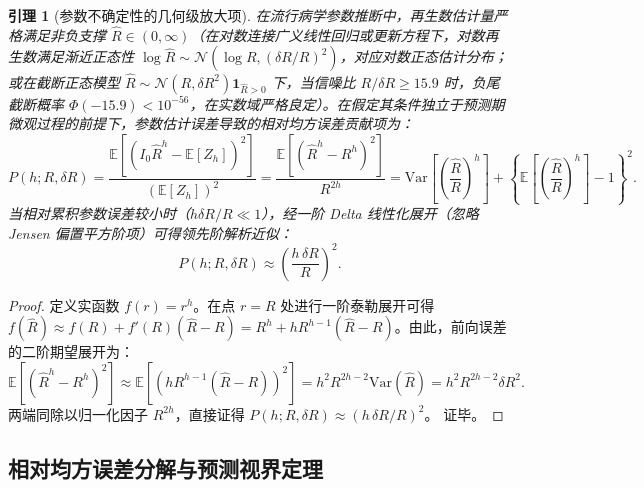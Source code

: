 \documentclass[11pt,a4paper]{article}
\theoremstyle{plain}
\newtheorem{lemma}{引理}
\theoremstyle{definition}
\begin{document}
\begin{lemma}[参数不确定性的几何级放大项]\label{lem:param_amplification}
在流行病学参数推断中，再生数估计量严格满足非负支撑 $\hat{R} \in (0, \infty)$（在对数连接广义线性回归或更新方程下，对数再生数满足渐近正态性 $\log \hat{R} \sim \mathcal{N}(\log R, (\delta R / R)^2)$，对应对数正态估计分布；或在截断正态模型 $\hat{R} \sim \mathcal{N}(R, \delta R^2)\mathbf{1}_{\hat{R}>0}$ 下，当信噪比 $R/\delta R \ge 15.9$ 时，负尾截断概率 $\Phi(-15.9) < 10^{-56}$，在实数域严格良定）。在假定其条件独立于预测期微观过程的前提下，参数估计误差导致的相对均方误差贡献项为：
\begin{equation}
P(h; R, \delta R) = \frac{\mathbb{E}[(I_0 \hat{R}^h - \mathbb{E}[Z_h])^2]}{(\mathbb{E}[Z_h])^2} = \frac{\mathbb{E}[(\hat{R}^h - R^h)^2]}{R^{2h}} = \text{Var}\left[\left(\frac{\hat{R}}{R}\right)^h\right] + \left\{\mathbb{E}\left[\left(\frac{\hat{R}}{R}\right)^h\right] - 1\right\}^2.
\end{equation}
当相对累积参数误差较小时（$h \delta R / R \ll 1$），经一阶 Delta 线性化展开（忽略 Jensen 偏置平方阶项）可得领先阶解析近似：
\begin{equation}
P(h; R, \delta R) \approx \left(\frac{h\,\delta R}{R}\right)^2.
\end{equation}
\end{lemma}

\begin{proof}
定义实函数 $f(r) = r^h$。在点 $r = R$ 处进行一阶泰勒展开可得 $f(\hat{R}) \approx f(R) + f'(R)(\hat{R}-R) = R^h + h R^{h-1}(\hat{R}-R)$。由此，前向误差的二阶期望展开为：
\begin{equation}
\mathbb{E}[(\hat{R}^h - R^h)^2] \approx \mathbb{E}[(h R^{h-1}(\hat{R}-R))^2] = h^2 R^{2h-2} \text{Var}(\hat{R}) = h^2 R^{2h-2} \delta R^2.
\end{equation}
两端同除以归一化因子 $R^{2h}$，直接证得 $P(h; R, \delta R) \approx (h\,\delta R/R)^2$。
证毕。
\end{proof}

\subsection{相对均方误差分解与预测视界定理}
\end{document}
